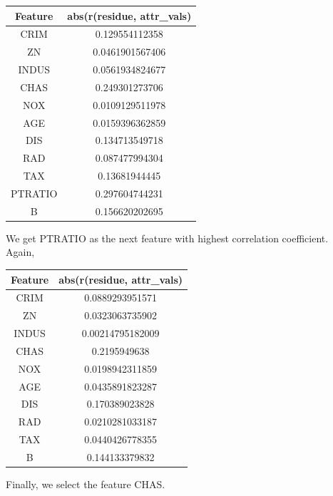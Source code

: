 \documentclass[]{report}
\begin{document}
	    \begin{center}
	    \begin{tabular}{c|c}
			\hline
			 Feature & abs(r(residue, attr\_vals)  \\
			\hline
			 CRIM    & 0.129554112358  \\
			 ZN      & 0.0461901567406 \\
			 INDUS   & 0.0561934824677 \\
			 CHAS    & 0.249301273706  \\
			 NOX     & 0.0109129511978 \\
			 AGE     & 0.0159396362859 \\
			 DIS     & 0.134713549718  \\
			 RAD     & 0.087477994304  \\
			 TAX     & 0.13681944445   \\
			 PTRATIO & 0.297604744231  \\
			 B       & 0.156620202695  \\
			\hline
			\end{tabular}
	    \end{center}

	    We get PTRATIO as the next feature with highest correlation coefficient. \\

	    Again,
	    \begin{center}
	    \begin{tabular}{c|c}
			\hline
			 Feature & abs(r(residue, attr\_vals)  \\
			\hline
			 CRIM    & 0.0889293951571  \\
			 ZN      & 0.0323063735902  \\
			 INDUS   & 0.00214795182009 \\
			 CHAS    & 0.2195949638     \\
			 NOX     & 0.0198942311859  \\
			 AGE     & 0.0435891823287  \\
			 DIS     & 0.170389023828   \\
			 RAD     & 0.0210281033187  \\
			 TAX     & 0.0440426778355  \\
			 B       & 0.144133379832   \\
			\hline
		\end{tabular}
	    \end{center}

	  	Finally, we select the feature CHAS.\\
\end{document}
